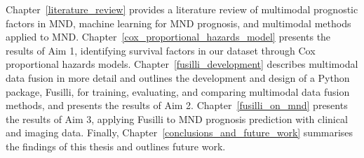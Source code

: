 Chapter~\ref{literature_review} provides a literature review of multimodal prognostic factors in MND, machine learning for MND prognosis, and multimodal methods applied to MND.
Chapter~\ref{cox_proportional_hazards_model} presents the results of Aim 1, identifying survival factors in our dataset through Cox proportional hazards models.
Chapter~\ref{fusilli_development} describes multimodal data fusion in more detail and outlines the development and design of a Python package, Fusilli, for training, evaluating, and comparing multimodal data fusion methods, and presents the results of Aim 2.
Chapter~\ref{fusilli_on_mnd} presents the results of Aim 3, applying Fusilli to MND prognosis prediction with clinical and imaging data.
Finally, Chapter~\ref{conclusions_and_future_work} summarises the findings of this thesis and outlines future work.